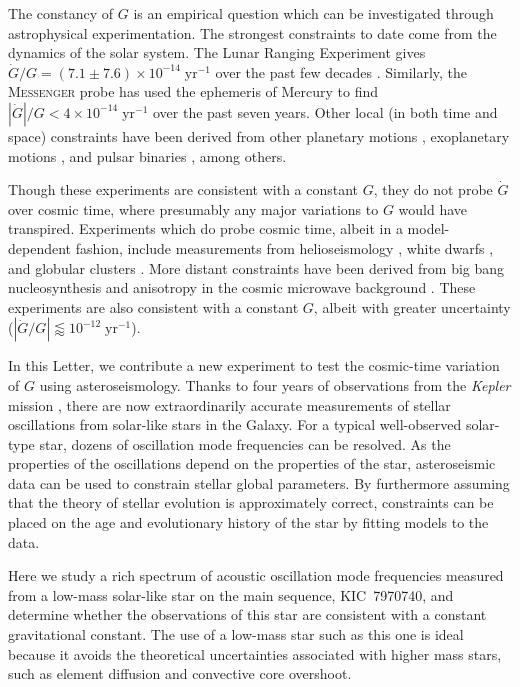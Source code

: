 \documentclass[twocolumn]{aastex63}
\begin{document}
The constancy of $G$ is an empirical question which can be investigated through astrophysical experimentation. 
The strongest constraints to date come from the dynamics of the solar system. 
The Lunar Ranging Experiment \citep{1962Natur.194.1267S, 2013RPPh...76g6901M} gives $\dot{G}/G = {(7.1\pm7.6) \times 10^{-14}}\;\text{yr}^{-1}$ over the past few decades \citep{0264-9381-35-3-035015}. 
Similarly, the \textsc{Messenger} probe \citep{2018NatCo...9..289G} has used the ephemeris of Mercury to find ${|\dot{G}|/G < 4 \times 10^{-14}}\;\text{yr}^{-1}$ over the past seven years. 
Other local (in both time and space) constraints have been derived from other planetary motions \citep{PhysRevLett.51.1609}, exoplanetary motions \citep{2016PASJ...68L...5M}, and pulsar binaries \citep{1991ApJ...366..501D, 2019MNRAS.482.3249Z}, among others. 

Though these experiments are consistent with a constant $G$, they do not probe $\dot G$ over cosmic time, where presumably any major variations to $G$ would have transpired. 
Experiments which do probe cosmic time, albeit in a model-dependent fashion, include measurements from helioseismology \citep{1998ApJ...498..871G}, white dwarfs \citep{2011JCAP...05..021G, 2013JCAP...06..032C}, and globular clusters \citep{1996A&A...312..345D}. 
More distant constraints have been derived from big bang nucleosynthesis \citep{1990PhLB..248..146A} and anisotropy in the cosmic microwave background \citep{2004PhRvD..69h3512N}. 
These experiments are also consistent with a constant $G$, albeit with greater uncertainty ($|\dot G/G| \lessapprox 10^{-12}\;\text{yr}^{-1}$). 

In this Letter, we contribute a new experiment to test the cosmic-time variation of $G$ using asteroseismology. 
Thanks to four years of observations from the \emph{Kepler} mission \citep{2010Sci...327..977B}, there are now extraordinarily accurate measurements of stellar oscillations from solar-like stars in the Galaxy. 
For a typical well-observed solar-type star, dozens of oscillation mode frequencies can be resolved. 
As the properties of the oscillations depend on the properties of the star, asteroseismic data can be used to constrain stellar global parameters. 
By furthermore assuming that the theory of stellar evolution is approximately correct, constraints can be placed on the age and evolutionary history of the star by fitting models to the data. 

Here we study a rich spectrum of acoustic oscillation mode frequencies measured from a low-mass solar-like star on the main sequence, KIC~7970740, and determine whether the observations of this star are consistent with a constant gravitational constant. 
The use of a low-mass star such as this one is ideal because it avoids the theoretical uncertainties associated with higher mass stars, such as element diffusion and convective core overshoot. 
\end{document}
